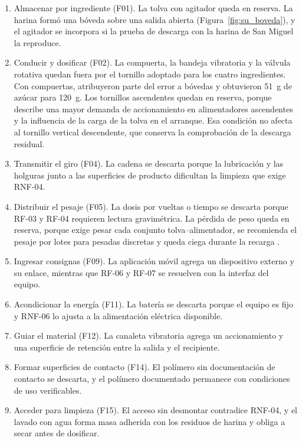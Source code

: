 \begin{enumerate}
    \item Almacenar por ingrediente (F01). La tolva con agitador queda en
    reserva. La harina formó una bóveda sobre una salida abierta
    (Figura~\ref{fig:su_boveda}), y el agitador se incorpora si la prueba de
    descarga con la harina de San Miguel la reproduce.
    \item Conducir y dosificar (F02). La compuerta, la bandeja vibratoria y
    la válvula rotativa quedan fuera por el tornillo adoptado para los
    cuatro ingredientes. Con compuertas, \textcite{rumapea2026flour}
    atribuyeron parte del error a bóvedas y \textcite{bachtiar2026brownies}
    obtuvieron 51~g de azúcar para 120~g. Los tornillos ascendentes quedan
    en reserva, porque \textcite{kwsScrewFeeders} describe una mayor demanda
    de accionamiento en alimentadores ascendentes y la influencia de la
    carga de la tolva en el arranque. Esa condición no afecta al tornillo
    vertical descendente, que conserva la comprobación de la descarga
    residual.
    \item Transmitir el giro (F04). La cadena se descarta porque la
    lubricación y las holguras junto a las superficies de producto
    dificultan la limpieza que exige RNF-04.
    \item Distribuir el pesaje (F05). La dosis por vueltas o tiempo se
    descarta porque RF-03 y RF-04 requieren lectura gravimétrica. La pérdida
    de peso queda en reserva, porque exige pesar cada conjunto
    tolva--alimentador, se recomienda el pesaje por lotes para pesadas
    discretas y queda ciega durante la recarga
    \parencite{chiliguana2016rediseno,blackshields2018continuous}.
    \item Ingresar consignas (F09). La aplicación móvil agrega un
    dispositivo externo y su enlace, mientras que RF-06 y RF-07 se resuelven
    con la interfaz del equipo.
    \item Acondicionar la energía (F11). La batería se descarta porque el
    equipo es fijo y RNF-06 lo ajusta a la alimentación eléctrica
    disponible.
    \item Guiar el material (F12). La canaleta vibratoria agrega un
    accionamiento y una superficie de retención entre la salida y el
    recipiente.
    \item Formar superficies de contacto (F14). El polímero sin
    documentación de contacto se descarta, y el polímero documentado
    permanece con condiciones de uso verificables.
    \item Acceder para limpieza (F15). El acceso sin desmontar contradice
    RNF-04, y el lavado con agua forma masa adherida con los residuos de
    harina y obliga a secar antes de dosificar.
\end{enumerate}

